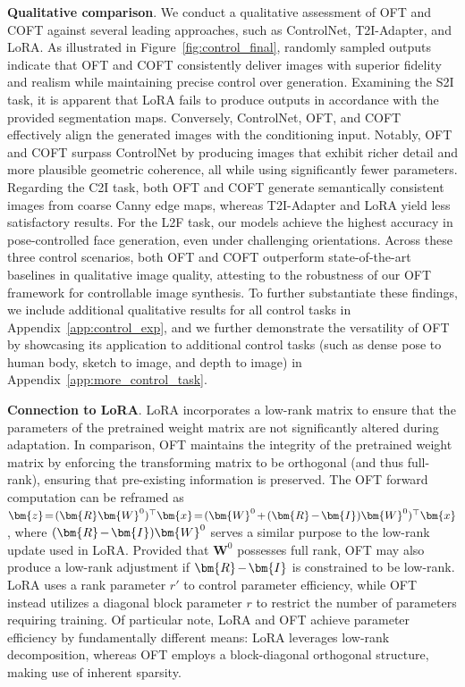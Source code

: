 \textbf{Qualitative comparison}. We conduct a qualitative assessment of OFT and COFT against several leading approaches, such as ControlNet, T2I-Adapter, and LoRA. As illustrated in Figure~\ref{fig:control_final}, randomly sampled outputs indicate that OFT and COFT consistently deliver images with superior fidelity and realism while maintaining precise control over generation. Examining the S2I task, it is apparent that LoRA fails to produce outputs in accordance with the provided segmentation maps. Conversely, ControlNet, OFT, and COFT effectively align the generated images with the conditioning input. Notably, OFT and COFT surpass ControlNet by producing images that exhibit richer detail and more plausible geometric coherence, all while using significantly fewer parameters. Regarding the C2I task, both OFT and COFT generate semantically consistent images from coarse Canny edge maps, whereas T2I-Adapter and LoRA yield less satisfactory results. For the L2F task, our models achieve the highest accuracy in pose-controlled face generation, even under challenging orientations. Across these three control scenarios, both OFT and COFT outperform state-of-the-art baselines in qualitative image quality, attesting to the robustness of our OFT framework for controllable image synthesis. To further substantiate these findings, we include additional qualitative results for all control tasks in Appendix~\ref{app:control_exp}, and we further demonstrate the versatility of OFT by showcasing its application to additional control tasks (such as dense pose to human body, sketch to image, and depth to image) in Appendix~\ref{app:more_control_task}.

\textbf{Connection to LoRA}. LoRA incorporates a low-rank matrix to ensure that the parameters of the pretrained weight matrix are not significantly altered during adaptation. In comparison, OFT maintains the integrity of the pretrained weight matrix by enforcing the transforming matrix to be orthogonal (and thus full-rank), ensuring that pre-existing information is preserved. The OFT forward computation can be reframed as $\thickmuskip=2mu \medmuskip=2mu \bm{z}=(\bm{R}\bm{W}^0)^\top\bm{x}=(\bm{W}^0+(\bm{R}-\bm{I})\bm{W}^0)^\top\bm{x}$, where $\thickmuskip=2mu \medmuskip=2mu (\bm{R}-\bm{I})\bm{W}^0$ serves a similar purpose to the low-rank update used in LoRA. Provided that $\bm{W}^0$ possesses full rank, OFT may also produce a low-rank adjustment if $\thickmuskip=2mu \medmuskip=2mu \bm{R}-\bm{I}$ is constrained to be low-rank. LoRA uses a rank parameter $r'$ to control parameter efficiency, while OFT instead utilizes a diagonal block parameter $r$ to restrict the number of parameters requiring training. Of particular note, LoRA and OFT achieve parameter efficiency by fundamentally different means: LoRA leverages low-rank decomposition, whereas OFT employs a block-diagonal orthogonal structure, making use of inherent sparsity.


